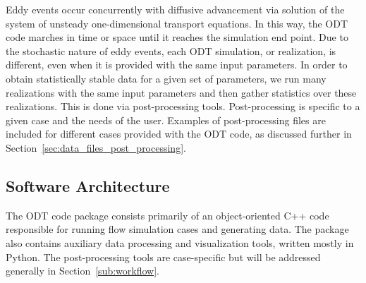 \documentclass[preprint,12pt, a4paper]{elsarticle}
\begin{document}
Eddy events occur concurrently with diffusive advancement via solution of the system of unsteady one-dimensional transport equations. In this way, the ODT code marches in time or space until it reaches the simulation end point. Due to the stochastic nature of eddy events, each ODT simulation, or realization, is different, even when it is provided with the same input parameters. In order to obtain statistically stable data for a given set of parameters, we run many realizations with the same input parameters and then gather statistics over these realizations. This is done via post-processing tools. Post-processing is specific to a given case and the needs of the user. Examples of post-processing files are included for different cases provided with the ODT code, as discussed further in Section~\ref{sec:data_files_post_processing}.

\subsection{Software Architecture}
\label{sub:architecture}

The ODT code package consists primarily of an object-oriented C++ code responsible for running flow simulation cases and generating data. The package also contains auxiliary data processing and visualization tools, written mostly in Python. The post-processing tools are case-specific but will be  addressed generally in Section~\ref{sub:workflow}. 
\end{document}
